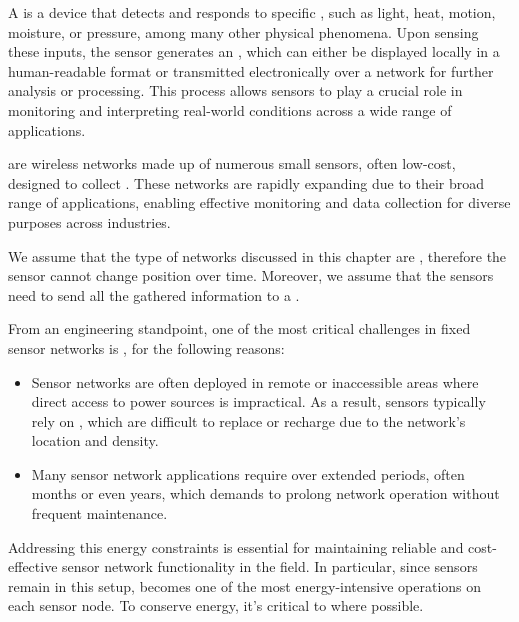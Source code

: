 \documentclass[a4paper, 12pt]{report}
\begin{document}
    A  is a device that detects and responds to specific , such as light, heat, motion, moisture, or pressure, among many other physical phenomena. Upon sensing these inputs, the sensor generates an , which can either be displayed locally in a human-readable format or transmitted electronically over a network for further analysis or processing. This process allows sensors to play a crucial role in monitoring and interpreting real-world conditions across a wide range of applications.

     are wireless networks made up of numerous small sensors, often low-cost, designed to collect . These networks are rapidly expanding due to their broad range of applications, enabling effective monitoring and data collection for diverse purposes across industries.

    We assume that the type of networks discussed in this chapter are , therefore the sensor cannot change position over time. Moreover, we assume that the sensors need to send all the gathered information to a .
    
    From an engineering standpoint, one of the most critical challenges in fixed sensor networks is , for the following reasons:

    \begin{itemize}
        \item Sensor networks are often deployed in remote or inaccessible areas where direct access to power sources is impractical. As a result, sensors typically rely on , which are difficult to replace or recharge due to the network's location and density.
        \item Many sensor network applications require  over extended periods, often months or even years, which demands  to prolong network operation without frequent maintenance.
    \end{itemize}

     Addressing this energy constraints is essential for maintaining reliable and cost-effective sensor network functionality in the field. In particular, since sensors remain  in this setup,  becomes one of the most energy-intensive operations on each sensor node. To conserve energy, it's critical to  where possible.
\end{document}
